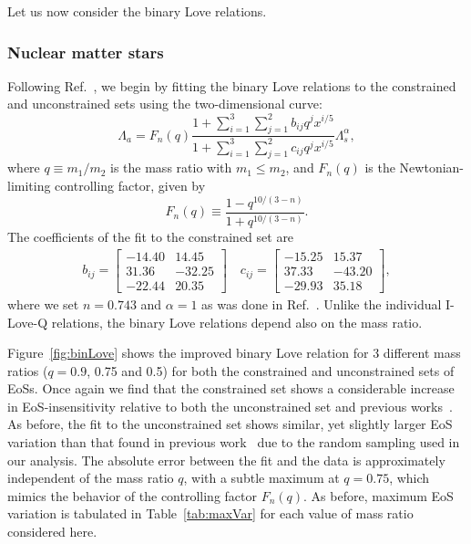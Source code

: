 \documentclass[prd,twocolumn,nofootinbib,superscriptaddress,amsmath,amssymb]{revtex4-1}
\begin{document}
Let us now consider the binary Love relations.  


\subsubsection{Nuclear matter stars}

Following Ref.~\cite{Yagi:binLove}, we begin by fitting the binary Love relations to the constrained and unconstrained sets using the two-dimensional curve:
\begin{equation}\label{eq:binLovefit}
\Lambda_a=F_n(q) \frac{1+ \sum_{i=1}^3 \sum_{j=1}^2 b_{ij}q^j x^{i/5}}{1 + \sum_{i=1}^3 \sum_{j=1}^2 c_{ij}q^j x^{i/5}} \Lambda_s^{\alpha},
\end{equation}
where $q\equiv m_{1}/m_{2}$ is the mass ratio with $m_1 \leq m_2$, and $F_n(q)$ is the Newtonian-limiting controlling factor, given by
\begin{equation}\label{eq:control}
F_n(q) \equiv \frac{1-q^{10/(3-n)}}{1+q^{10/(3-n)}}.
\end{equation}
The coefficients of the fit to the constrained set are 
\begin{align}
b_{ij} = \begin{bmatrix}
    -14.40 & 14.45   \\
    31.36 & -32.25   \\
    -22.44 & 20.35   
\end{bmatrix}
\quad
c_{ij} = \begin{bmatrix}
    -15.25 & 15.37   \\
    37.33 & -43.20   \\
    -29.93 & 35.18   
\end{bmatrix},
\end{align}
where we set $n = 0.743$ and $\alpha = 1$ as was done in Ref.~\cite{Yagi:binLove}.
Unlike the individual I-Love-Q relations, the binary Love relations depend also on the mass ratio. 

Figure~\ref{fig:binLove} shows the improved binary Love relation for 3 different mass ratios ($q=0.9$, 0.75 and 0.5) for both the constrained and unconstrained sets of EoSs. Once again we find that the constrained set shows a considerable increase in EoS-insensitivity relative to both the unconstrained set and previous works~\cite{Yagi:binLove}. As before, the fit to the unconstrained set shows similar, yet slightly larger EoS variation than that found in previous work~\cite{Yagi:binLove} due to the random sampling used in our analysis. The absolute error between the fit and the data is approximately independent of the mass ratio $q$, with a subtle maximum at $q=0.75$, which mimics the behavior of the controlling factor $F_n(q)$. As before, maximum EoS variation is tabulated in Table~\ref{tab:maxVar} for each value of mass ratio considered here.
\end{document}
